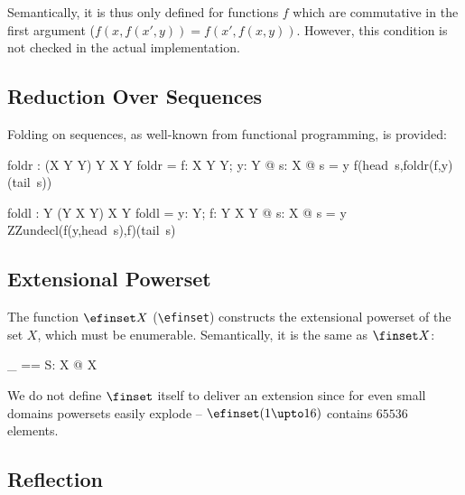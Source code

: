 \documentclass{article}
\begin{document}
Semantically, it is thus only defined for functions $f$ which are
commutative in the first argument ($f(x,f(x',y)) =
f(x',f(x,y))$. However, this condition is not checked in the actual
implementation.

\subsection{Reduction Over Sequences}

Folding on sequences, as well-known from functional
programming, is provided:

\begin{axdef}[X,Y]
  foldr : (X \cross Y \pfun Y) \cross Y  \fun \seq X \pfun Y
\where
  foldr = \lambda f: X \cross Y \pfun Y; y: Y @
           \lambda s: \seq X @
              \IF s = \langle\rangle \THEN y 
              \ELSE f(head~s,foldr(f,y)(tail~s))
\end{axdef}

\begin{axdef}[X,Y]
  foldl : Y \cross (Y \cross X \pfun Y) \fun \seq X \pfun Y
\where
  foldl = \lambda y: Y; f: Y \cross X \pfun Y @
           \lambda s: \seq X @
              \IF s = \langle\rangle \THEN y 
              \ELSE ZZundecl(f(y,head~s),f)(tail~s)
\end{axdef}



\subsection{Extensional Powerset}

The function $\efinset X$ (\verb:\efinset:) constructs the
extensional powerset of the set $X$, which must be enumerable.
Semantically, it is the same as $\finset X$:

\begin{zedgroup}
\begin{zdirectives}
\end{zdirectives}
\begin{axdef}[X]
  \efinset \_ == \lambda S: \power X @ \finset X
\end{axdef}
\end{zedgroup}

We do not define $\finset$ itself to deliver an extension since for
even small domains powersets easily explode -- $\efinset
(1 \upto 16)$ contains $65536$ elements.


\subsection{Reflection}
\end{document}
